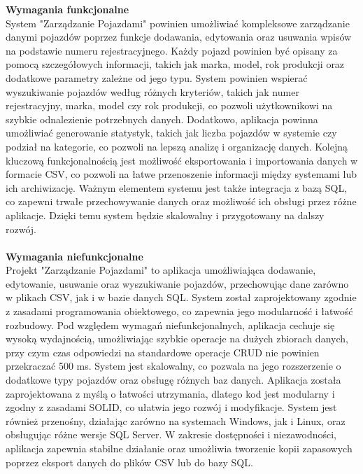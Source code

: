 \noindent \textbf{Wymagania funkcjonalne}
\\
System "Zarządzanie Pojazdami" powinien umożliwiać kompleksowe zarządzanie danymi pojazdów poprzez funkcje dodawania, edytowania oraz usuwania wpisów na podstawie numeru rejestracyjnego. Każdy pojazd powinien być opisany za pomocą szczegółowych informacji, takich jak marka, model, rok produkcji oraz dodatkowe parametry zależne od jego typu.
System powinien wspierać wyszukiwanie pojazdów według różnych kryteriów, takich jak numer rejestracyjny, marka, model czy rok produkcji, co pozwoli użytkownikowi na szybkie odnalezienie potrzebnych danych. Dodatkowo, aplikacja powinna umożliwiać generowanie statystyk, takich jak liczba pojazdów w systemie czy podział na kategorie, co pozwoli na lepszą analizę i organizację danych.
Kolejną kluczową funkcjonalnością jest możliwość eksportowania i importowania danych w formacie CSV, co pozwoli na łatwe przenoszenie informacji między systemami lub ich archiwizację. Ważnym elementem systemu jest także integracja z bazą SQL, co zapewni trwałe przechowywanie danych oraz możliwość ich obsługi przez różne aplikacje. Dzięki temu system będzie skalowalny i przygotowany na dalszy rozwój.
\\
\\\noindent \textbf{Wymagania niefunkcjonalne }
\\
Projekt "Zarządzanie Pojazdami" to aplikacja umożliwiająca dodawanie, edytowanie, usuwanie oraz wyszukiwanie pojazdów, przechowując dane zarówno w plikach CSV, jak i w bazie danych SQL. System został zaprojektowany zgodnie z zasadami programowania obiektowego, co zapewnia jego modularność i łatwość rozbudowy.
Pod względem wymagań niefunkcjonalnych, aplikacja cechuje się wysoką wydajnością, umożliwiając szybkie operacje na dużych zbiorach danych, przy czym czas odpowiedzi na standardowe operacje CRUD nie powinien przekraczać 500 ms. System jest skalowalny, co pozwala na jego rozszerzenie o dodatkowe typy pojazdów oraz obsługę różnych baz danych.
Aplikacja została zaprojektowana z myślą o łatwości utrzymania, dlatego kod jest modularny i zgodny z zasadami SOLID, co ułatwia jego rozwój i modyfikacje. System jest również przenośny, działając zarówno na systemach Windows, jak i Linux, oraz obsługując różne wersje SQL Server.
W zakresie dostępności i niezawodności, aplikacja zapewnia stabilne działanie oraz umożliwia tworzenie kopii zapasowych poprzez eksport danych do plików CSV lub do bazy SQL. 


